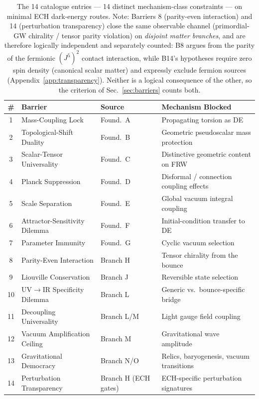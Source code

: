\documentclass[aps,prd,twocolumn,superscriptaddress,showpacs,preprintnumbers,nofootinbib,longbibliography,floatfix]{revtex4-2}
\begin{document}
\begin{table}[tb]
\caption{\label{tab:barriers} The 14 catalogue entries --- 14 distinct
mechanism-class constraints --- on minimal ECH dark-energy routes. Note:
Barriers 8 (parity-even interaction) and 14 (perturbation transparency)
close the same
observable channel (primordial-GW chirality / tensor parity violation) on
\emph{disjoint matter branches}, and are therefore logically independent
and separately counted: B8 argues from the parity of the fermionic
$(J^5)^2$ contact interaction, while B14's hypotheses require zero spin
density (canonical scalar matter) and expressly exclude fermion sources
(Appendix~\ref{app:transparency}). Neither is a logical consequence of
the other, so the criterion of Sec.~\ref{sec:barriers} counts both.}
\centering
\begin{tabular*}{\textwidth}{@{\extracolsep{\fill}}clll}
\toprule
\# & Barrier & Source & Mechanism Blocked \\
\midrule
1 & Mass-Coupling Lock & Found.\ A & Propagating torsion as DE \\
2 & Topological-Shift Duality & Found.\ B & Geometric pseudoscalar mass protection \\
3 & Scalar-Tensor Universality & Found.\ C & Distinctive geometric content on FRW \\
4 & Planck Suppression & Found.\ D & Disformal / connection coupling effects \\
5 & Scale Separation & Found.\ E & Global vacuum integral coupling \\
6 & Attractor-Sensitivity Dilemma & Found.\ F & Initial-condition transfer to DE \\
7 & Parameter Immunity & Found.\ G & Cyclic vacuum selection \\
8 & Parity-Even Interaction & Branch H & Tensor chirality from the bounce \\
9 & Liouville Conservation & Branch J & Reversible state selection \\
10 & UV$\to$IR Specificity Dilemma & Branch L & Generic vs.\ bounce-specific bridge \\
11 & Decoupling Universality & Branch L/M & Light gauge field coupling \\
12 & Vacuum Amplification Ceiling & Branch M & Gravitational wave amplitude \\
13 & Gravitational Democracy & Branch N/O & Relics, baryogenesis, vacuum transitions \\
14 & Perturbation Transparency & Branch H (ECH gates) & ECH-specific perturbation signatures \\
\bottomrule
\end{tabular*}
\end{table}
\end{document}
